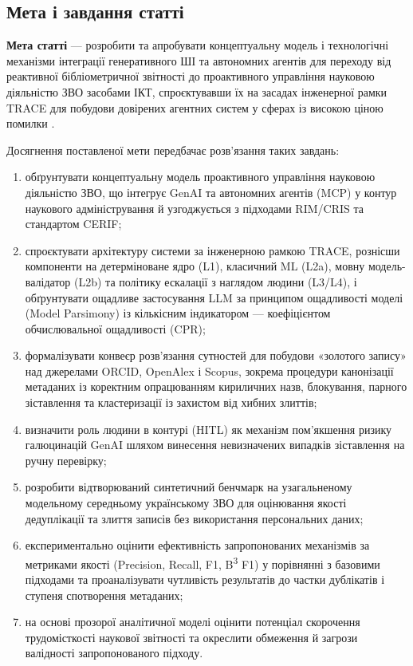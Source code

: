 \subsection*{Мета і завдання статті}

\textbf{Мета статті} --- розробити та апробувати концептуальну модель і технологічні механізми інтеграції генеративного ШІ та автономних агентів для переходу від реактивної бібліометричної звітності до проактивного управління науковою діяльністю ЗВО засобами ІКТ, спроєктувавши їх на засадах інженерної рамки TRACE для побудови довірених агентних систем у сферах із високою ціною помилки \cite{Zabolotnii2026TRACE}.

Досягнення поставленої мети передбачає розв'язання таких завдань:

\begin{enumerate}
    \item обґрунтувати концептуальну модель проактивного управління науковою діяльністю ЗВО, що інтегрує GenAI та автономних агентів (MCP) у контур наукового адміністрування й узгоджується з підходами RIM/CRIS та стандартом CERIF;
    \item спроєктувати архітектуру системи за інженерною рамкою TRACE, рознісши компоненти на детерміноване ядро (L1), класичний ML (L2a), мовну модель-валідатор (L2b) та політику ескалації з наглядом людини (L3/L4), і обґрунтувати ощадливе застосування LLM за принципом ощадливості моделі (Model Parsimony) із кількісним індикатором --- коефіцієнтом обчислювальної ощадливості (CPR);
    \item формалізувати конвеєр розв'язання сутностей для побудови «золотого запису» над джерелами ORCID, OpenAlex і Scopus, зокрема процедури канонізації метаданих із коректним опрацюванням кириличних назв, блокування, парного зіставлення та кластеризації із захистом від хибних злиттів;
    \item визначити роль людини в контурі (HITL) як механізм пом'якшення ризику галюцинацій GenAI шляхом винесення невизначених випадків зіставлення на ручну перевірку;
    \item розробити відтворюваний синтетичний бенчмарк на узагальненому модельному середньому українському ЗВО для оцінювання якості дедуплікації та злиття записів без використання персональних даних;
    \item експериментально оцінити ефективність запропонованих механізмів за метриками якості (Precision, Recall, F1, B\textsuperscript{3} F1) у порівнянні з базовими підходами та проаналізувати чутливість результатів до частки дублікатів і ступеня спотворення метаданих;
    \item на основі прозорої аналітичної моделі оцінити потенціал скорочення трудомісткості наукової звітності та окреслити обмеження й загрози валідності запропонованого підходу.
\end{enumerate}
